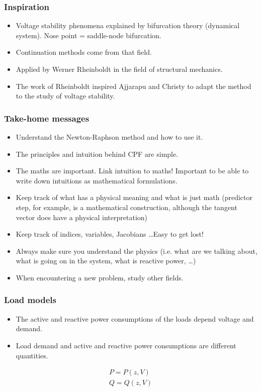 \documentclass{beamer}
\begin{document}
\begin{frame}
  \frametitle{Inspiration}
  \begin{itemize}
  \item Voltage stability phenomena explained by bifurcation theory (dynamical system). Nose point = saddle-node bifurcation.
  \item Continuation methods come from that field.
  \item Applied by Werner Rheinboldt in the field of structural mechanics.
  \item The work of Rheinboldt inspired Ajjarapu and Christy to adapt the method to the study of voltage stability.
  \end{itemize}
\end{frame}

\begin{frame}
  \frametitle{Take-home messages}
  \begin{itemize}
  \item Understand the Newton-Raphson method and how to use it.
  \item The principles and intuition behind CPF are simple.
  \item The maths are important. Link intuition to maths! Important to be able to write down intuitions as mathematical formulations.
  \item Keep track of what has a physical meaning and what is just math (predictor step, for example, is a mathematical construction, although the tangent vector does have a physical interpretation)
  \item Keep track of indices, variables, Jacobians \ldots Easy to get lost!
  \item Always make sure you understand the physics (i.e. what are we talking about, what is going on in the system, what is reactive power, \ldots)
  \item When encountering a new problem, study other fields.
  \end{itemize}
\end{frame}

\begin{frame}
  \frametitle{Load models}
  \begin{itemize}
  \item The active and reactive power consumptions of the loads depend voltage and demand.
  \item Load demand and active and reactive power consumptions are different quantities.
  \end{itemize}
  \begin{align*}
    P = P(z,V)\\
    Q = Q(z,V)
  \end{align*}
\end{frame}
\end{document}
